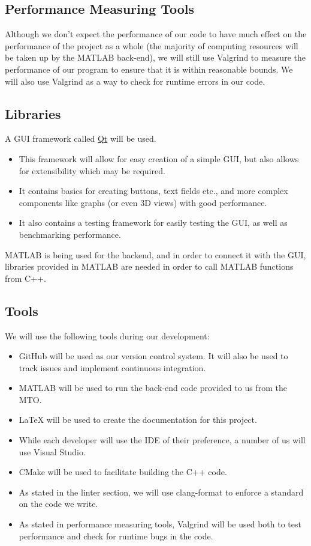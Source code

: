 \documentclass{article}
\begin{document}
\subsection{Performance Measuring Tools}
Although we don't expect the performance of our code to have much effect on the performance of the project as a whole (the majority of computing resources will be taken up by the MATLAB back-end), we will still use Valgrind to measure the performance of our program to ensure that
it is within reasonable bounds. We will also use Valgrind as a way to check for runtime errors in our code.

\subsection{Libraries}
A GUI framework called \href{https://www.qt.io/}{Qt} will be used.
\begin{itemize}
	\item This framework will allow for easy creation of a simple GUI, but also allows for extensibility which may be required.
	\item It contains basics for creating buttons, text fields etc., and more complex components like graphs (or even 3D views) with good performance.
	\item It also contains a testing framework for easily testing the GUI, as well as benchmarking performance.
\end{itemize}
MATLAB is being used for the backend, and in order to connect it with the GUI, libraries provided in MATLAB are needed in order to call MATLAB functions
from C++.

\subsection{Tools}
We will use the following tools during our development:
\begin{itemize}
	\item GitHub will be used as our version control system. It will also be used to track issues and implement continuous integration.
	\item MATLAB will be used to run the back-end code provided to us from the MTO.
	\item LaTeX will be used to create the documentation for this project.
	\item While each developer will use the IDE of their preference, a number of us will use Visual Studio.
	\item CMake will be used to facilitate building the C++ code.
	\item As stated in the linter section, we will use clang-format to enforce a standard on the code we write.
	\item As stated in performance measuring tools, Valgrind will be used both to test performance and check for runtime bugs in the code.
\end{itemize}
\end{document}
